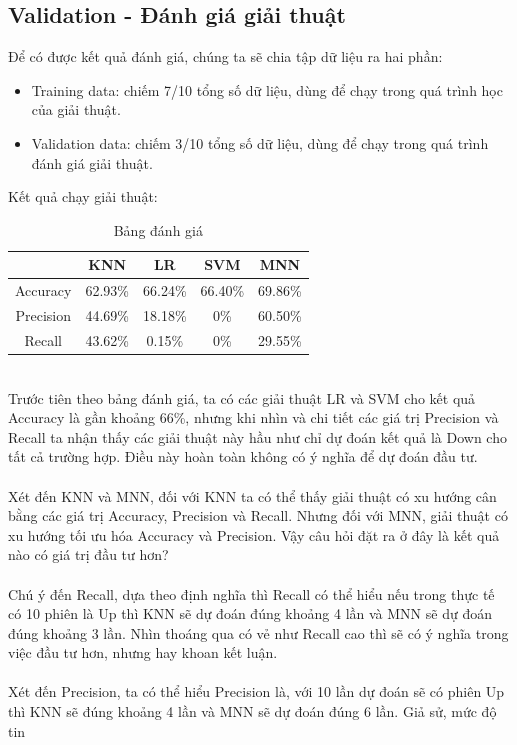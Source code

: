 \subsection{Validation - Đánh giá giải thuật}
Để có được kết quả đánh giá, chúng ta sẽ chia tập dữ liệu ra hai phần:
\begin{itemize}
\item Training data: chiếm 7/10 tổng số dữ liệu, dùng để chạy trong quá trình 
học của giải thuật.
\item Validation data: chiếm 3/10 tổng số dữ liệu, dùng để chạy trong quá trình 
đánh giá giải thuật.
\end{itemize}
Kết quả chạy giải thuật:\\
\begin{table}[h]
\centering
\begin{tabular}{ |c|c|c|c|c| }
\hline
 & KNN & LR & SVM & MNN \\
\hline
Accuracy & 62.93\% & 66.24\% & 66.40\% & 69.86\% \\
\hline
Precision & 44.69\% & 18.18\% & 0\% & 60.50\% \\
\hline
Recall & 43.62\% & 0.15\% & 0\% & 29.55\% \\
\hline
\end{tabular}
\caption{Bảng đánh giá}
\end{table}\\
Trước tiên theo bảng đánh giá, ta có các giải thuật LR và SVM cho kết quả Accuracy
là gần khoảng 66\%, nhưng khi nhìn và chi tiết các giá trị Precision và Recall 
ta nhận thấy các giải thuật này hầu như chỉ dự đoán kết quả là Down cho tất cả 
trường hợp. Điều này hoàn toàn không có ý nghĩa để dự đoán đầu tư.\\\\
Xét đến KNN và MNN, đối với KNN ta có thể thấy giải thuật có xu hướng cân bằng 
các giá trị Accuracy, Precision và Recall. Nhưng đối với MNN, giải thuật có xu 
hướng tối ưu hóa Accuracy và Precision. Vậy câu hỏi đặt ra ở đây là kết quả nào 
có giá trị đầu tư hơn?\\\\
Chú ý đến Recall, dựa theo định nghĩa thì Recall có thể hiểu nếu trong thực tế 
có 10 phiên là Up thì KNN sẽ dự đoán đúng khoảng 4 lần và MNN sẽ dự đoán đúng 
khoảng 3 lần. Nhìn thoáng qua có vẻ như Recall cao thì sẽ có ý nghĩa trong việc 
đầu tư hơn, nhưng hay khoan kết luận.\\\\
Xét đến Precision, ta có thể hiểu Precision là, với 10 lần dự đoán sẽ có phiên 
Up thì KNN sẽ đúng khoảng 4 lần và MNN sẽ dự đoán đúng 6 lần. Giả sử, mức độ tin 
